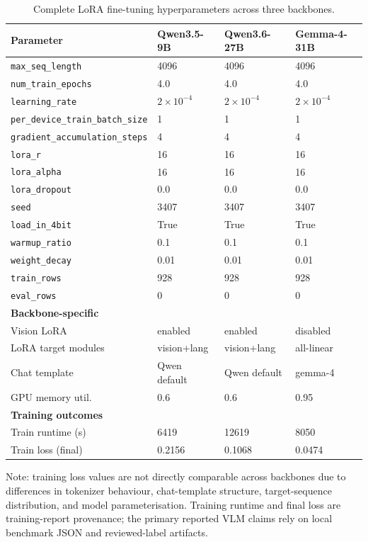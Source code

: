 \begin{table}[htbp]
  \centering
  \caption{Complete LoRA fine-tuning hyperparameters across three backbones.}
  \label{tab:lora-hyperparams-full}
  \small
  \begin{tabular}{@{}llll@{}}
  \toprule
  \textbf{Parameter} & \textbf{Qwen3.5-9B} & \textbf{Qwen3.6-27B} & \textbf{Gemma-4-31B} \\
  \midrule
  \texttt{max\_seq\_length} & 4096 & 4096 & 4096 \\
  \texttt{num\_train\_epochs} & 4.0 & 4.0 & 4.0 \\
  \texttt{learning\_rate} & $2{\times}10^{-4}$ & $2{\times}10^{-4}$ & $2{\times}10^{-4}$ \\
  \texttt{per\_device\_train\_batch\_size} & 1 & 1 & 1 \\
  \texttt{gradient\_accumulation\_steps} & 4 & 4 & 4 \\
  \texttt{lora\_r} & 16 & 16 & 16 \\
  \texttt{lora\_alpha} & 16 & 16 & 16 \\
  \texttt{lora\_dropout} & 0.0 & 0.0 & 0.0 \\
  \texttt{seed} & 3407 & 3407 & 3407 \\
  \texttt{load\_in\_4bit} & True & True & True \\
  \texttt{warmup\_ratio} & 0.1 & 0.1 & 0.1 \\
  \texttt{weight\_decay} & 0.01 & 0.01 & 0.01 \\
  \texttt{train\_rows} & 928 & 928 & 928 \\
  \texttt{eval\_rows} & 0 & 0 & 0 \\
  \midrule
  \textbf{Backbone-specific} & & & \\
  \midrule
  Vision LoRA & enabled & enabled & disabled \\
  LoRA target modules & vision+lang & vision+lang & all-linear \\
  Chat template & Qwen default & Qwen default & gemma-4 \\
  GPU memory util. & 0.6 & 0.6 & 0.95 \\
  \midrule
  \textbf{Training outcomes} & & & \\
  \midrule
  Train runtime (s) & 6419 & 12619 & 8050 \\
  Train loss (final) & 0.2156 & 0.1068 & 0.0474 \\
  \bottomrule
  \end{tabular}
\end{table}

Note: training loss values are not directly comparable across backbones due to
differences in tokenizer behaviour, chat-template structure, target-sequence
distribution, and model parameterisation. Training runtime and final loss are
training-report provenance; the primary reported VLM claims rely on local
benchmark JSON and reviewed-label artifacts.

